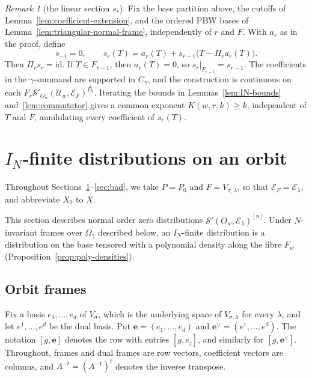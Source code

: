 \documentclass[a4paper,12pt]{amsart}
\numberwithin{equation}{section}
\theoremstyle{definition}
\theoremstyle{remark}
\newtheorem{remark}[theorem]{Remark}
\newcommand{\fn}{\mathfrak n}
\newcommand{\IN}{I_N}
\newcommand{\mcU}{\mathcal U}
\newcommand{\mcS}{\mathcal S}
\newcommand{\mcE}{\mathcal E}
\newcommand{\id}{\mathrm{id}}
\begin{document}
\begin{remark}[the linear section $s_r$]\label{rem:section-sr}
Fix the base partition above, the cutoffs of Lemma~\ref{lem:coefficient-extension}, and the ordered PBW bases of Lemma~\ref{lem:triangular-normal-frame}, independently of $r$ and $F$. With $a_r$ as in the proof, define
\[
 s_{-1}=0,\qquad
 s_r(T)=a_r(T)+s_{r-1}\bigl(T-\Pi_ra_r(T)\bigr).
\]
Then $\Pi_rs_r=\id$. If $T\in F_{r-1}$, then $a_r(T)=0$, so $s_r|_{F_{r-1}}=s_{r-1}$. The coefficients in the $\gamma$-summand are supported in $C_\gamma$, and the construction is continuous on each $F_r\mcS'_{O_w}(\mcU_w,\mcE_F)^{\IN^k}$. Iterating the bounds in Lemmas~\ref{lem:IN-bounds} and~\ref{lem:commutator} gives a common exponent $K(w,r,k)\ge k$, independent of $T$ and $F$, annihilating every coefficient of $s_r(T)$.
\end{remark}

\section{\texorpdfstring{$\IN$}{I-N}-finite distributions on an orbit}\label{sec:fiber}

Throughout Sections~\ref{sec:fiber}--\ref{sec:bad}, we take $P=P_0$ and $F=V_{\sigma,\lambda}$, so that $\mcE_F=\mcE_\lambda$, and abbreviate $X_0$ to $X$.

This section describes normal order zero distributions $\mcS'(O_w,\mcE_\lambda)^{[\fn]}$. Under $N$-invariant frames over $\Omega_\gamma$ described below, an $\IN$-finite distribution is a distribution on the base tensored with a polynomial density along the fibre $F_w$ (Proposition~\ref{prop:poly-densities}).

\subsection{Orbit frames}\label{ssec:orbit-frames}

Fix a basis $e_1,\dots,e_d$ of $V_\sigma$, which is the underlying space of $V_{\sigma,\lambda}$ for every $\lambda$, and let $e^1,\dots,e^d$ be the dual basis. Put $\mathbf e=(e_1,\dots,e_d)$ and $\mathbf e^\vee=(e^1,\dots,e^d)$. The notation $[g,\mathbf e]$ denotes the row with entries $[g,e_j]$, and similarly for $[g,\mathbf e^\vee]$. Throughout, frames and dual frames are row vectors, coefficient vectors are columns, and $A^{-t}=(A^{-1})^t$ denotes the inverse transpose.
\end{document}
